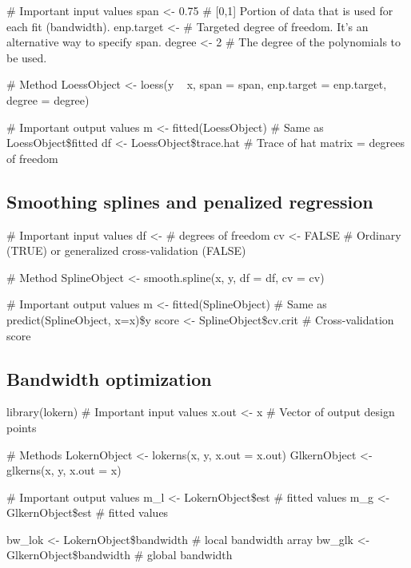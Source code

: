 \begin{code}
 # Important input values
 span <- 0.75 # [0,1] Portion of data that is used for each fit (bandwidth).
 enp.target <- # Targeted degree of freedom. It's an alternative way to specify span.
 degree <- 2 # The degree of the polynomials to be used.
 
 # Method
 LoessObject <- loess(y ~ x, span = span, enp.target = enp.target, degree = degree)
 
 # Important output values
 m <- fitted(LoessObject) # Same as LoessObject\$fitted
 df <- LoessObject\$trace.hat # Trace of hat matrix = degrees of freedom
\end{code}

\subsection{Smoothing splines and penalized regression}
\label{subsec:smoothing_splines}
\begin{code}
 # Important input values
 df <- # degrees of freedom
 cv <- FALSE # Ordinary (TRUE) or generalized cross-validation (FALSE)

 # Method
 SplineObject <- smooth.spline(x, y, df = df, cv = cv)
 
 # Important output values
 m <- fitted(SplineObject) # Same as predict(SplineObject, x=x)\$y
 score <- SplineObject\$cv.crit # Cross-validation score
\end{code}

\subsection{Bandwidth optimization}
\begin{code}
 library(lokern)
 # Important input values
 x.out <- x # Vector of output design points
 
 # Methods
 LokernObject <- lokerns(x, y, x.out = x.out)
 GlkernObject <- glkerns(x, y, x.out = x)

 # Important output values
 m_l <- LokernObject\$est # fitted values
 m_g <- GlkernObject\$est # fitted values
 
 bw_lok <- LokernObject\$bandwidth # local bandwidth array
 bw_glk <- GlkernObject\$bandwidth # global bandwidth
\end{code}

